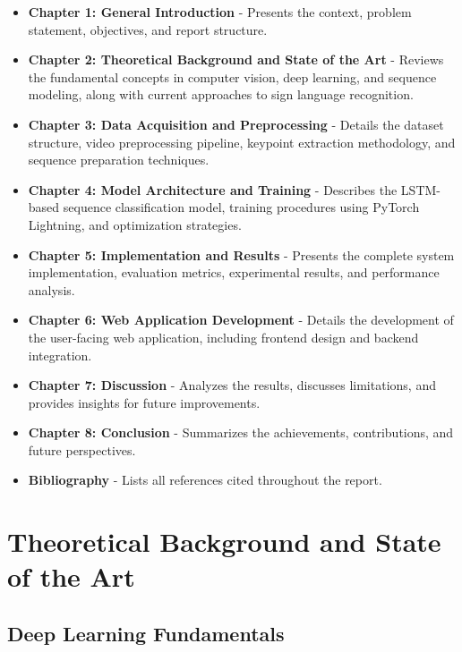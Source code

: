 \documentclass[11pt, a4paper]{article}
\begin{document}
\begin{itemize}
    \item \textbf{Chapter 1: General Introduction} - Presents the context, problem statement, objectives, and report structure.
    
    \item \textbf{Chapter 2: Theoretical Background and State of the Art} - Reviews the fundamental concepts in computer vision, deep learning, and sequence modeling, along with current approaches to sign language recognition.
    
    \item \textbf{Chapter 3: Data Acquisition and Preprocessing} - Details the dataset structure, video preprocessing pipeline, keypoint extraction methodology, and sequence preparation techniques.
    
    \item \textbf{Chapter 4: Model Architecture and Training} - Describes the LSTM-based sequence classification model, training procedures using PyTorch Lightning, and optimization strategies.
    
    \item \textbf{Chapter 5: Implementation and Results} - Presents the complete system implementation, evaluation metrics, experimental results, and performance analysis.
    
    \item \textbf{Chapter 6: Web Application Development} - Details the development of the user-facing web application, including frontend design and backend integration.
    
    \item \textbf{Chapter 7: Discussion} - Analyzes the results, discusses limitations, and provides insights for future improvements.
    
    \item \textbf{Chapter 8: Conclusion} - Summarizes the achievements, contributions, and future perspectives.
    
    \item \textbf{Bibliography} - Lists all references cited throughout the report.
\end{itemize}

\section{Theoretical Background and State of the Art}

\subsection{Deep Learning Fundamentals}
\end{document}
